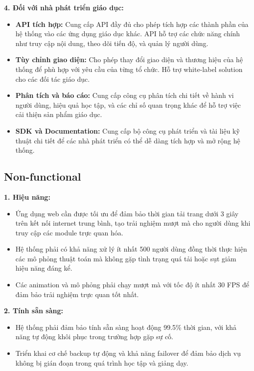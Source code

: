 \textbf{4. Đối với nhà phát triển giáo dục:}

\begin{itemize}
\item \textbf{API tích hợp:} Cung cấp API đầy đủ cho phép tích hợp các thành phần của hệ thống vào các ứng dụng giáo dục khác. API hỗ trợ các chức năng chính như truy cập nội dung, theo dõi tiến độ, và quản lý người dùng.

\item \textbf{Tùy chỉnh giao diện:} Cho phép thay đổi giao diện và thương hiệu của hệ thống để phù hợp với yêu cầu của từng tổ chức. Hỗ trợ white-label solution cho các đối tác giáo dục.

\item \textbf{Phân tích và báo cáo:} Cung cấp công cụ phân tích chi tiết về hành vi người dùng, hiệu quả học tập, và các chỉ số quan trọng khác để hỗ trợ việc cải thiện sản phẩm giáo dục.

\item \textbf{SDK và Documentation:} Cung cấp bộ công cụ phát triển và tài liệu kỹ thuật chi tiết để các nhà phát triển có thể dễ dàng tích hợp và mở rộng hệ thống.
\end{itemize}

\subsection{Non-functional}

\textbf{1. Hiệu năng:}
\begin{itemize}
\item Ứng dụng web cần được tối ưu để đảm bảo thời gian tải trang dưới 3 giây trên kết nối internet trung bình, tạo trải nghiệm mượt mà cho người dùng khi truy cập các module trực quan hóa.
\item Hệ thống phải có khả năng xử lý ít nhất 500 người dùng đồng thời thực hiện các mô phỏng thuật toán mà không gặp tình trạng quá tải hoặc sụt giảm hiệu năng đáng kể.
\item Các animation và mô phỏng phải chạy mượt mà với tốc độ ít nhất 30 FPS để đảm bảo trải nghiệm trực quan tốt nhất.
\end{itemize}

\textbf{2. Tính sẵn sàng:}
\begin{itemize}
\item Hệ thống phải đảm bảo tính sẵn sàng hoạt động 99.5\% thời gian, với khả năng tự động khôi phục trong trường hợp gặp sự cố.
\item Triển khai cơ chế backup tự động và khả năng failover để đảm bảo dịch vụ không bị gián đoạn trong quá trình học tập và giảng dạy.
\end{itemize}


